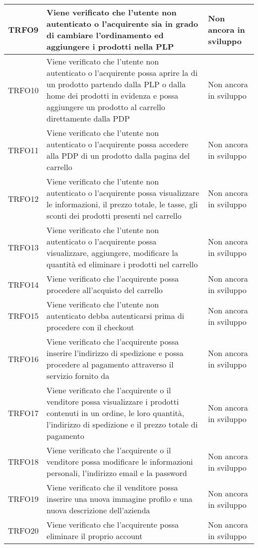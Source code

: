 \begin{longtable}{|c| C{10cm} |C{3cm}|}
	TRFO9 & Viene verificato che l'utente non autenticato o l'acquirente sia in grado di cambiare l'ordinamento ed aggiungere i prodotti nella PLP & Non ancora in sviluppo\\ \hline
	TRFO10 & Viene verificato che l'utente non autenticato o l'acquirente possa aprire la  di un prodotto partendo dalla PLP o dalla home dei prodotti in evidenza e possa aggiungere un prodotto al carrello direttamente dalla PDP & Non ancora in sviluppo\\ \hline
	TRFO11 & Viene verificato che l'utente non autenticato o l'acquirente possa accedere alla PDP di un prodotto dalla pagina del carrello & Non ancora in sviluppo\\ \hline
    TRFO12 & Viene verificato che l'utente non autenticato o l'acquirente possa visualizzare le informazioni, il prezzo totale, le tasse, gli sconti dei prodotti presenti nel carrello & Non ancora in sviluppo\\ \hline
    TRFO13 & Viene verificato che l'utente non autenticato o l'acquirente possa visualizzare, aggiungere, modificare la quantità ed eliminare i prodotti nel carrello & Non ancora in sviluppo\\ \hline
    TRFO14 & Viene verificato che l'acquirente possa procedere all'acquisto del carrello & Non ancora in sviluppo\\ \hline
    TRFO15 & Viene verificato che l'utente non autenticato debba autenticarsi prima di procedere con il checkout & Non ancora in sviluppo\\ \hline
    TRFO16 & Viene verificato che l'acquirente possa inserire l'indirizzo di spedizione e possa procedere al pagamento attraverso il servizio fornito da  & Non ancora in sviluppo\\ \hline
	TRFO17 & Viene verificato che l'acquirente o il venditore possa visualizzare i prodotti contenuti in un ordine, le loro quantità, l'indirizzo di spedizione e il prezzo totale di pagamento & Non ancora in sviluppo\\ \hline
	TRFO18 & Viene verificato che l'acquirente o il venditore possa modificare le informazioni personali, l'indirizzo email e la password & Non ancora in sviluppo\\ \hline
	TRFO19 & Viene verificato che il venditore possa inserire una nuova immagine profilo e una nuova descrizione dell'azienda & Non ancora in sviluppo\\ \hline
	TRFO20 & Viene verificato che l'acquirente possa eliminare il proprio account & Non ancora in sviluppo\\ \hline

\end{longtable}
